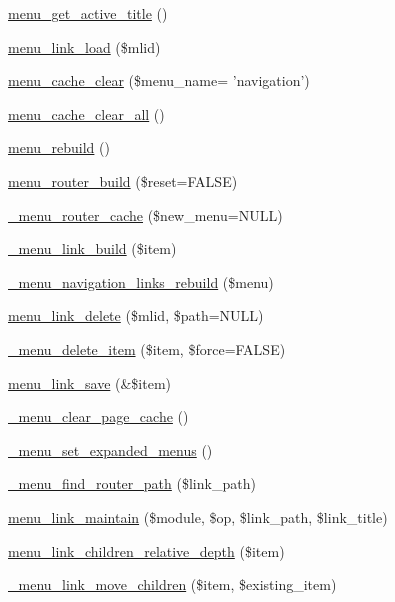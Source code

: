 \begin{CompactItemize}
\item 
\hyperlink{group__menu_gf0a358447097959e53ad1a20b8d811ed}{menu\_\-get\_\-active\_\-title} ()
\item 
\hyperlink{group__menu_gc2b338fa3a449c826661aade7a7d486e}{menu\_\-link\_\-load} (\$mlid)
\item 
\hyperlink{group__menu_g032d6b78c7deab10685ebfa6f32ad7eb}{menu\_\-cache\_\-clear} (\$menu\_\-name= 'navigation')
\item 
\hyperlink{group__menu_g0a10fa44ca152a12091747e515b6a655}{menu\_\-cache\_\-clear\_\-all} ()
\item 
\hyperlink{group__menu_gf36dcb9d5491ef5e7d2cf22c1f5c69f4}{menu\_\-rebuild} ()
\item 
\hyperlink{group__menu_ge6e2fcdb614d7988c160c22d563919ba}{menu\_\-router\_\-build} (\$reset=FALSE)
\item 
\hyperlink{group__menu_g02af3d3800722e9ff5be36485b655905}{\_\-menu\_\-router\_\-cache} (\$new\_\-menu=NULL)
\item 
\hyperlink{group__menu_gdf1f694a2079dcdd6526150eb195915b}{\_\-menu\_\-link\_\-build} (\$item)
\item 
\hyperlink{group__menu_g69fdf86c20d033bc7ba46a14937e20ea}{\_\-menu\_\-navigation\_\-links\_\-rebuild} (\$menu)
\item 
\hyperlink{group__menu_gcb2dddc8ca84476f38a90f4487156b12}{menu\_\-link\_\-delete} (\$mlid, \$path=NULL)
\item 
\hyperlink{group__menu_gf60be5755b46e635c04963e61cdc809a}{\_\-menu\_\-delete\_\-item} (\$item, \$force=FALSE)
\item 
\hyperlink{group__menu_g4fe84fbe31b5a3b6c7fa43e8fe912fb0}{menu\_\-link\_\-save} (\&\$item)
\item 
\hyperlink{group__menu_g6b3bf9ba8f43f983382911beb62ffba0}{\_\-menu\_\-clear\_\-page\_\-cache} ()
\item 
\hyperlink{group__menu_g08212e3890c64045fcf6b44032b343a0}{\_\-menu\_\-set\_\-expanded\_\-menus} ()
\item 
\hyperlink{group__menu_g0842f6b9cf84f5e5ff159159063a78dd}{\_\-menu\_\-find\_\-router\_\-path} (\$link\_\-path)
\item 
\hyperlink{group__menu_ge3248649fb437dedad940df74fb129dc}{menu\_\-link\_\-maintain} (\$module, \$op, \$link\_\-path, \$link\_\-title)
\item 
\hyperlink{group__menu_g75c0660b49841423d8d3c8908e9023fc}{menu\_\-link\_\-children\_\-relative\_\-depth} (\$item)
\item 
\hyperlink{group__menu_geb7542558d6fab7c79b96c1188ee6d67}{\_\-menu\_\-link\_\-move\_\-children} (\$item, \$existing\_\-item)

\end{CompactItemize}

